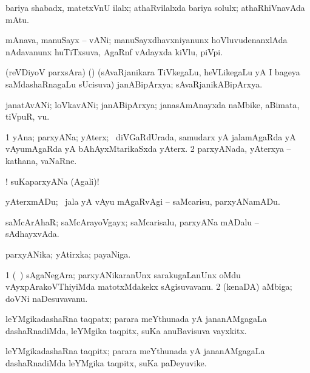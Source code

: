 \bentry 
{} 
\gl{\nA}
\expl{\Latin }
\bmng
bariya shabadx, matetxVnU ilalx; athaRvilalxda bariya solulx; athaRhiVnavAda mAtu. 
\emng
\eentry

\bentry 
{} 
\gl{\nA}
\expl{\Latin}
\bmng
mAnava, manuSayx -- vANi; manuSayxdhavxniyanunx hoVluvudenanxlAda nAdavanunx huTiTxsuva, AgaRnf vAdayxda kiVlu, piVpi. 
\emng
\eentry

\bentry 
{} 
\gl{\nA}
\expl{}
\bmng
 (reVDiyoV parxsAra) (\AmA) (sAvaRjanikara TiVkegaLu, heVLikegaLu yA I bageya saMdashaRnagaLu sUcisuva) janABipArxya; sAvaRjanikABipArxya. 
\emng
\eentry

\bentry 
{} 
\gl{\nA}
\expl{\Latin}
\bmng
janatAvANi; loVkavANi; janABipArxya; janasAmAnayxda naMbike, aBimata, tiVpuR, \mo vu. 
\emng
\eentry

\bentry
{} 
\gl{\nA}
\expl{}
\bmng
\bnum
\num{1} yAna; parxyANa; yAterx; \kanmu\ diVGaRdUrada, samudarx yA jalamAgaRda yA vAyumAgaRda yA bAhAyxMtarikaSxda yAterx. 
\num{2} parxyANada, yAterxya -- kathana, vaNaRne. 
\enum
\emng

\noindent 
\gl{\pagu}
\expl{}
\bmng
{}! suKaparxyANa (Agali)! 
\emng
\eentry

\bentry
{} 
\gl{\sakirx}
\expl{}
\bmng
 yAterxmADu; \kanmu\ jala yA vAyu mAgaRvAgi -- saMcarisu, parxyANamADu. 
\emng
\eentry

\bentry 
{} 
\gl{\gu}
\expl{}
\bmng
 saMcArAhaR; saMcArayoVgayx; saMcarisalu, parxyANa mADalu -- sAdhayxvAda. 
\emng
\eentry

\bentry 
{} 
\gl{\nA}
\expl{}
\bmng
 parxyANika; yAtirxka; payaNiga. 
\emng
\eentry

\bentry 
{} 
\gl{\nA}
\expl{}
\bmng
\bnum
\num{1} (\kanmu\ \ca) sAgaNegAra; parxyANikaranUnx sarakugaLanUnx oMdu vAyxpArakoVThiyiMda matotxMdakekx sAgisuvavanu. 
\num{2} (kenaDA) aMbiga; doVNi naDesuvavanu. 
\enum
\emng
\eentry

\bentry
{} 
\gl{\nA}
\expl{}
\bmng
 leYMgikadashaRna taqpatx; parara meYthunada yA jananAMgagaLa dashaRnadiMda, leYMgika taqpitx, suKa anuBavisuva vayxkitx. 
\emng
\eentry

\bentry 
{} 
\gl{\nA}
\expl{}
\bmng
 leYMgikadashaRna taqpitx; parara meYthunada yA jananAMgagaLa dashaRnadiMda leYMgika taqpitx, suKa paDeyuvike. 
\emng
\eentry

